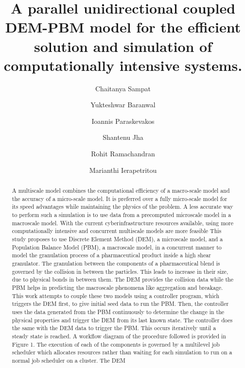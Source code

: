 \documentclass[preprint,11pt,authoryear]{elsarticle}
\begin{document}
\begin{frontmatter}

\title{A parallel unidirectional coupled DEM-PBM model for the efficient solution and simulation of 
computationally  intensive systems.}
\author[add1]{Chaitanya Sampat}
\author[add1]{Yukteshwar Baranwal}
\author[add2]{Ioannis Paraskevakos}
\author[add2]{Shantenu Jha}
\author[add1]{Rohit Ramachandran}
\author[add1]{Marianthi Ierapetritou}
\address[add1]{Department of Chemical and Biochemical Engineering, Rutgers, The State University of New
Jersey, Piscataway, NJ, USA-08854}
\address[add2]{Electrical and Computer Engineering, Rutgers, The State University of New Jersey, 
Piscataway, NJ, USA-08854}

\begin{abstract}
A multiscale model combines the computational efficiency of a macro-scale model and the 
accuracy of a micro-scale model. It is preferred over a fully micro-scale model for its speed 
advantages while maintaining the physics of the problem. A less accurate way to perform such a
simulation is to use data from a precomputed microscale model in a macroscale model. With the
current cyberinfrastructure resources available, using more computationally intensive and 
concurrent multiscale models are more feasible This study proposes to use Discrete Element Method
(DEM), a microscale model, and a Population Balance Model (PBM), a macroscale model, in a
concurrent manner to model the granulation process of a pharmaceutical product inside a high
shear granulator. The granulation between the components of a pharmaceutical blend is governed
by the collision in between the particles. This leads to increase in their size, due to physical bonds
in between them. The DEM provides the collision data while the PBM helps in predicting the
macroscale phenomena like aggregation and breakage. This work attempts to couple these two
models using a controller program, which triggers the DEM first, to give initial seed data to run
the PBM. Then, the controller uses the data generated from the PBM continuously to determine
the change in the physical properties and trigger the DEM from its last known state. The controller
does the same with the DEM data to trigger the PBM. This occurs iteratively until a steady state
is reached. A workflow diagram of the procedure followed is provided in Figure 1. The execution
of each of the components is governed by a multilevel job scheduler which allocates resources
rather than waiting for each simulation to run on a normal job scheduler on a cluster. The DEM

\end{abstract}
\end{frontmatter}
\end{document}

